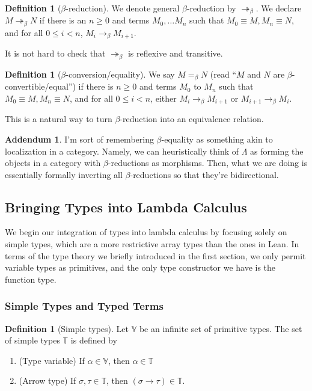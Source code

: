 \documentclass{article}
\theoremstyle{definition}
\newtheorem{definition} [theorem] {Definition}
\newtheorem{addendum}{Addendum}
\newcommand{\1}{\mathbb{1}}
\newcommand{\0}{\mathbb{0}}
\newcommand{\surj}{\twoheadrightarrow}
\newcommand{\bb}{\mathbb}
\begin{document}
\begin{definition}[$\beta$-reduction] 
We denote general $\beta$-reduction by $\surj_\beta$. We declare $M \surj_\beta N$ if there is an $n \geq 0$ and terms $M_0,\dots M_n$ such that $M_0 \equiv M, M_n \equiv N$, and for all $0 \leq i < n$, $M_i \to_\beta M_{i + 1}$. 
\end{definition}

It is not hard to check that $\surj_\beta$ is reflexive and transitive. 

\begin{definition}[$\beta$-conversion/equality]
    We say $M=_\beta N$ (read \enquote{$M$ and $N$ are $\beta$-convertible/equal}) if there is $n \geq 0$ and terms $M_0$ to $M_n$ such that $M_0 \equiv M, M_n \equiv N$, and for all $0 \leq i < n$, either $M_i \to_\beta M_{i + 1}$ or $M_{i + 1} \to_\beta M_i$.
\end{definition}

This is a natural way to turn $\beta$-reduction into an equivalence relation.

\begin{addendum}
    I'm sort of remembering $\beta$-equality as something akin to localization in a category. Namely, we can heuristically think of $\Lambda$ as forming the objects in a category with $\beta$-reductions as morphisms. Then, what we are doing is essentially formally inverting all $\beta$-reductions so that they're bidirectional. 
\end{addendum}

\subsection{Bringing Types into Lambda Calculus}

We begin our integration of types into lambda calculus by focusing solely on simple types, which are a more restrictive array types than the ones in Lean. In terms of the type theory we briefly introduced in the first section, we only permit variable types as primitives, and the only type constructor we have is the function type. 

\subsubsection{Simple Types and Typed Terms}

\begin{definition}[Simple types]
    Let $\bb V$ be an infinite set of primitive types. The set of simple types $\bb T$ is defined by
    \begin{enumerate}
        \item (Type variable) If $\alpha \in \bb V$, then $\alpha \in \bb T$ 
        \item (Arrow type) If $\sigma, \tau \in \bb T$, then $(\sigma \to \tau) \in \bb T$. 
    \end{enumerate}
\end{definition}
\end{document}
